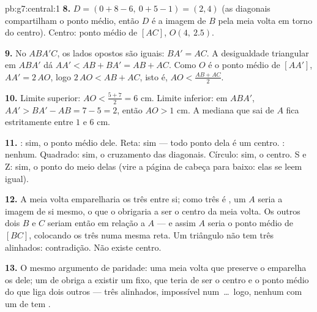\begin{solution}{pb:g7:central:1}
\textbf{8.} $D = (0 + 8 - 6,\ 0 + 5 - 1) = (2, 4)$ (as diagonais
compartilham o ponto médio, então $D$ é a imagem de $B$ pela meia volta
em torno do centro). Centro: ponto médio de $[AC]$, $O(4,\ 2.5)$.

\textbf{9.} No  $ABA'C$, os lados opostos são iguais:
$BA' = AC$. A desigualdade triangular em $ABA'$ dá
$AA' < AB + BA' = AB + AC$. Como $O$ é o ponto médio de $[AA']$,
$AA' = 2\,AO$, logo $2\,AO < AB + AC$, isto é,
$AO < \frac{AB + AC}{2}$.

\textbf{10.} Limite superior: $AO < \frac{5 + 7}{2} = 6$ cm. Limite
inferior: em $ABA'$, $AA' > BA' - AB = 7 - 5 = 2$, então $AO > 1$ cm. A
mediana que sai de $A$ fica estritamente entre $1$ e $6$ cm.

\textbf{11.} : sim, o ponto médio dele. Reta: sim --- todo
ponto dela é um centro. : nenhum. Quadrado: sim, o
cruzamento das diagonais. Círculo: sim, o centro. S e Z: sim, o ponto
do meio delas (vire a página de cabeça para baixo: elas se leem
igual).

\textbf{12.} A meia volta emparelharia os três  entre si; como
três é , um  $A$ seria a imagem de si mesmo, o que o
obrigaria a ser o centro da meia volta. Os outros dois  $B$ e
$C$ seriam então  em relação a $A$ --- e assim $A$ seria o
ponto médio de $[BC]$, colocando os três  numa mesma reta. Um
triângulo não tem três  alinhados: contradição. Não existe
centro.

\textbf{13.} O mesmo argumento de paridade: uma meia volta que preserve
o  emparelha os  dele; um  de 
obriga a existir um  fixo, que teria de ser o centro e o ponto
médio do  que liga dois outros  --- três 
alinhados, impossível num \,\dots\ logo, nenhum  com um
 de  tem .


\end{solution}
